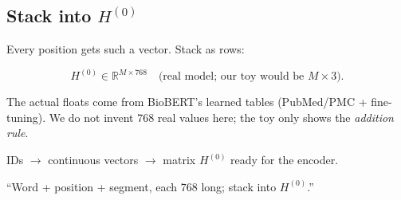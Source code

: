 \subsection*{Stack into \(H^{(0)}\)}

Every position gets such a vector. Stack as rows:

\[
  H^{(0)} \in \mathbb{R}^{M \times 768}
  \quad\text{(real model; our toy would be \(M\times 3\))}.
\]

\begin{notebox}
The actual floats come from BioBERT's learned tables (PubMed/PMC + fine-tuning).
We do not invent 768 real values here; the toy only shows the \emph{addition rule}.
\end{notebox}

\begin{stepbox}
IDs \(\to\) continuous vectors \(\to\) matrix \(H^{(0)}\) ready for the encoder.
\end{stepbox}

\begin{saybox}
``Word + position + segment, each 768 long; stack into \(H^{(0)}\).''
\end{saybox}
